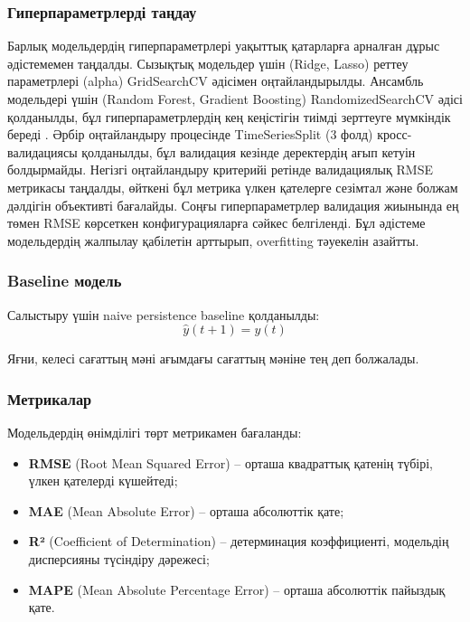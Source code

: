 \documentclass[12pt,a4paper]{article}
\begin{document}
\subsubsection{Гиперпараметрлерді таңдау}

Барлық модельдердің гиперпараметрлері уақыттық қатарларға арналған дұрыс әдістемемен таңдалды. Сызықтық модельдер үшін (Ridge, Lasso) реттеу параметрлері (alpha) GridSearchCV әдісімен оңтайландырылды. Ансамбль модельдері үшін (Random Forest, Gradient Boosting) RandomizedSearchCV әдісі қолданылды, бұл гиперпараметрлердің кең кеңістігін тиімді зерттеуге мүмкіндік береді \cite{hyndman2018}. Әрбір оңтайландыру процесінде TimeSeriesSplit (3 фолд) кросс-валидациясы қолданылды, бұл валидация кезінде деректердің ағып кетуін болдырмайды. Негізгі оңтайландыру критерийі ретінде валидациялық RMSE метрикасы таңдалды, өйткені бұл метрика үлкен қателерге сезімтал және болжам дәлдігін объективті бағалайды. Соңғы гиперпараметрлер валидация жиынында ең төмен RMSE көрсеткен конфигурацияларға сәйкес белгіленді. Бұл әдістеме модельдердің жалпылау қабілетін арттырып, overfitting тәуекелін азайтты.

\subsubsection{Baseline модель}

Салыстыру үшін naive persistence baseline қолданылды:
\begin{equation}
\hat{y}(t+1) = y(t)
\end{equation}

Яғни, келесі сағаттың мәні ағымдағы сағаттың мәніне тең деп болжалады.

\subsubsection{Метрикалар}

Модельдердің өнімділігі төрт метрикамен бағаланды:
\begin{itemize}
\item \textbf{RMSE} (Root Mean Squared Error) – орташа квадраттық қатенің түбірі, үлкен қателерді күшейтеді;
\item \textbf{MAE} (Mean Absolute Error) – орташа абсолюттік қате;
\item \textbf{R²} (Coefficient of Determination) – детерминация коэффициенті, модельдің дисперсияны түсіндіру дәрежесі;
\item \textbf{MAPE} (Mean Absolute Percentage Error) – орташа абсолюттік пайыздық қате.
\end{itemize}
\end{document}
